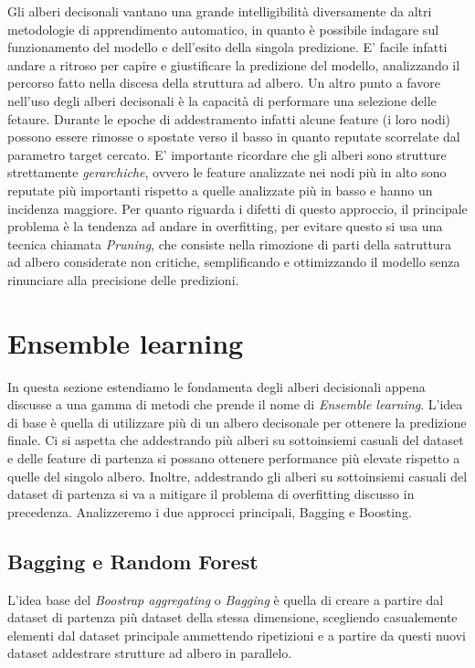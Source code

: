 \documentclass[12pt,a4paper,openright,twoside]{report}
\begin{document}
Gli alberi decisonali vantano una grande intelligibilità diversamente da altri metodologie di apprendimento automatico, in quanto è possibile indagare sul funzionamento del modello e dell'esito della singola predizione. E' facile infatti andare a ritroso per capire e giustificare la predizione del modello, analizzando il percorso fatto nella discesa della struttura ad albero. 
Un altro punto a favore nell'uso degli alberi decisonali è la capacità di performare una selezione delle fetaure. Durante le epoche di addestramento infatti alcune feature (i loro nodi) possono essere rimosse o spostate verso il basso in quanto reputate scorrelate dal parametro target cercato. 
E' importante ricordare che gli alberi sono strutture strettamente \emph{gerarchiche}, ovvero le feature analizzate nei nodi più in alto sono reputate più importanti rispetto a quelle analizzate più in basso e hanno un incidenza maggiore.
Per quanto riguarda i difetti di questo approccio, il principale problema è la tendenza ad andare in overfitting, per evitare questo si usa una tecnica chiamata \emph{Pruning}, che consiste nella rimozione di parti della satruttura ad albero considerate non critiche, semplificando e ottimizzando il modello senza rinunciare alla precisione delle predizioni. 
\section{Ensemble learning}
In questa sezione estendiamo le fondamenta degli alberi decisionali appena discusse a una gamma di metodi che prende il nome di \emph{Ensemble  learning}.
L'idea di base è quella di utilizzare più di un albero decisonale per ottenere la predizione finale. Ci si aspetta che addestrando più alberi su sottoinsiemi casuali del dataset e delle feature di partenza si possano ottenere performance più elevate rispetto a quelle del singolo albero. Inoltre, addestrando gli alberi su sottoinsiemi casuali del dataset di partenza si va a mitigare il problema di overfitting discusso in precedenza.
Analizzeremo i due approcci principali, Bagging e Boosting.
\subsection{Bagging e Random Forest}
L'idea base del \emph{Boostrap aggregating} o \emph{Bagging} è quella di creare a partire dal dataset di partenza più dataset della stessa dimensione, scegliendo casualemente elementi dal dataset principale ammettendo ripetizioni e a partire da questi nuovi dataset addestrare strutture ad albero in parallelo. 
\end{document}
